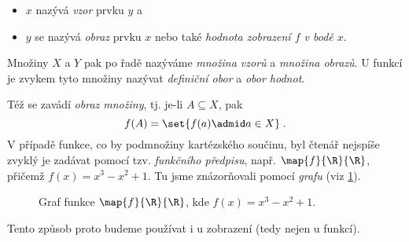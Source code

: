 \begin{itemize}
    \item $x$ nazývá \emph{vzor} prvku $y$ a
    \item $y$ se nazývá \emph{obraz} prvku $x$ nebo také \emph{hodnota zobrazení $f$ v bodě $x$}.
\end{itemize}
Množiny $X$ a $Y$ pak po řadě nazýváme \emph{množina vzorů} a \emph{množina obrazů}. U funkcí je zvykem tyto množiny nazývat \emph{definiční obor} a \emph{obor hodnot}.\par
Též se zavádí \emph{obraz množiny}, tj. je-li $A\subseteq X$, pak
\begin{equation*}
    f(A)=\set{f(a) \admid a\in X}\; .
\end{equation*}
V případě funkce, co by podmnožiny kartézského součinu, byl čtenář nejspíše zvyklý je zadávat pomocí tzv. \emph{funkčního předpisu}, např. $\map{f}{\R}{\R}$, přičemž $f(x)=x^3-x^2+1$. Tu jsme znázorňovali pomocí \emph{grafu} (viz \ref{fig:funkce_graf}).
\begin{figure}
    \centering
    
    \caption{Graf funkce $\map{f}{\R}{\R}$, kde $f(x)=x^3-x^2+1$.}
    \label{fig:funkce_graf}
\end{figure}
Tento způsob proto budeme používat i u zobrazení (tedy nejen u funkcí).
\medskip

